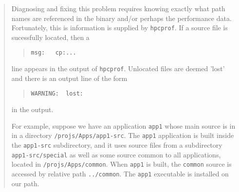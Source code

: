 \documentclass{article}
\newcommand{\hpcprof}{\texttt{hpcprof}}
\begin{document}
\begin{quote}
Diagnosing and fixing this problem requires knowing exactly what path
names are referenced in the binary and/or perhaps the performance
data. Fortunately, this is information is supplied by \hpcprof .
If a source file is sucessfully located, then a 
\begin{quote}
\verb|msg:   cp:...|
\end{quote}
line appears in the output of \hpcprof . Unlocated files are deemed 'lost'
and there is an output line of the form 
\begin{quote}
\verb|WARNING:  lost:|
\end{quote}
in the output.

For example, suppose we have an application \verb|app1| whose main source 
is in in a directory \verb|/projs/Apps/app1-src|. The \verb|app1|
application is built inside the \verb|app1-src| subdirectory, and it uses
source files from a subdirectory \verb|app1-src/special| as well as some
source common to all applications, located in
\verb|/projs/Apps/common|. When \verb|app1| is built, the
\verb|common| source is accessed by relative path \verb|../common|.
The \verb|app1| executable is installed on our path.


\end{quote}
\end{document}
